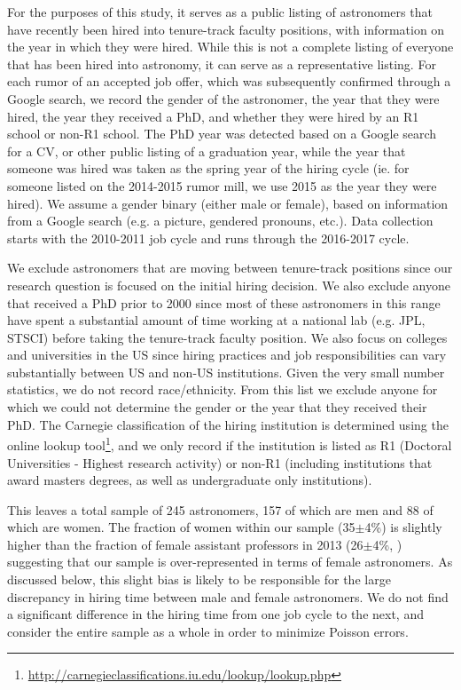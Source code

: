 \documentclass[modern]{aastex62}
\begin{document}
For the purposes of this study, it serves as a public listing of astronomers that have recently been hired into tenure-track faculty positions, with information on the year in which they were hired. While this is not a complete listing of everyone that has been hired into astronomy, it can serve as a representative listing. For each rumor of an accepted job offer, which was subsequently confirmed through a Google search, we record the gender of the astronomer, the year that they were hired, the year they received a PhD, and whether they were hired by an R1 school or non-R1 school. The PhD year was detected based on a Google search for a CV, or other public listing of a graduation year, while the year that someone was hired was taken as the spring year of the hiring cycle (ie. for someone listed on the 2014-2015 rumor mill, we use 2015 as the year they were hired). We assume a gender binary (either male or female), based on information from a Google search (e.g. a picture, gendered pronouns, etc.). Data collection starts with the 2010-2011 job cycle and runs through the 2016-2017 cycle. 

We exclude astronomers that are moving between tenure-track positions since our research question is focused on the initial hiring decision. We also exclude anyone that received a PhD prior to 2000 since most of these astronomers in this range have spent a substantial amount of time working at a national lab (e.g. JPL, STSCI) before taking the tenure-track faculty position. We also focus on colleges and universities in the US since hiring practices and job responsibilities can vary substantially between US and non-US institutions. Given the very small number statistics, we do not record race/ethnicity. From this list we exclude anyone for which we could not determine the gender or the year that they received their PhD. The Carnegie classification of the hiring institution is determined using the online lookup tool\footnote{\url{http://carnegieclassifications.iu.edu/lookup/lookup.php}}, and we only record if the institution is listed as R1 (Doctoral Universities - Highest research activity) or non-R1 (including institutions that award masters degrees, as well as undergraduate only institutions). 

This leaves a total sample of 245 astronomers, 157 of which are men and 88 of which are women. The fraction of women within our sample (35$\pm$4\%) is slightly higher than the fraction of female assistant professors in 2013 (26$\pm$4\%, \citet{hug14}) suggesting that our sample is over-represented in terms of female astronomers. As discussed below, this slight bias is likely to be responsible for the large discrepancy in hiring time between male and female astronomers. We do not find a significant difference in the hiring time from one job cycle to the next, and consider the entire sample as a whole in order to minimize Poisson errors. 
\end{document}
